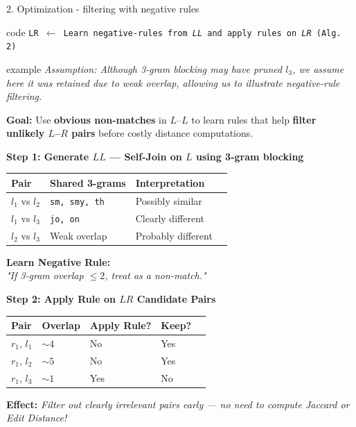 \documentclass[8pt]{beamer} %
\begin{document}
\begin{frame}{2. Optimization - filtering with negative rules}
	

	\begin{beamercolorbox}[rounded=true, shadow=true, leftskip=1em, rightskip=1em]{code}
		\texttt{LR $\leftarrow$ Learn negative-rules from \textit{LL} and apply rules on \textit{LR} (Alg. 2)}
	\end{beamercolorbox}


	

	\begin{beamercolorbox}[rounded=true, shadow=true, leftskip=1em, rightskip=1em]{example}
		\textit{\small Assumption: Although 3-gram blocking may have pruned $l_3$, we assume here it was retained due to weak overlap, allowing us to illustrate negative-rule filtering.}
		
		\vspace{1em}
		\textbf{Goal:} Use \textbf{obvious non-matches} in $L$–$L$ to learn rules that help \textbf{filter unlikely $L$–$R$ pairs} before costly distance computations.
		
		\vspace{0.5em}
		\textbf{Step 1: Generate $LL$ — Self-Join on $L$ using 3-gram blocking}
		
		\begin{tabular}{llll}
			\textbf{Pair} & \textbf{Shared 3-grams} & \textbf{Interpretation} \\
			\hline
			$l_1$ vs $l_2$ & \texttt{sm, smy, th}  & Possibly similar \\
			$l_1$ vs $l_3$ & \texttt{jo, on}       & Clearly different \\
			$l_2$ vs $l_3$ & Weak overlap          & Probably different \\
		\end{tabular}
		
		\vspace{0.5em}
		\textbf{Learn Negative Rule:} \\
		\textit{"If 3-gram overlap $\leq 2$, treat as a non-match."}
		
		\vspace{0.5em}
		\textbf{Step 2: Apply Rule on $LR$ Candidate Pairs}
		\begin{tabular}{lllll}
			\textbf{Pair} & \textbf{Overlap} & \textbf{Apply Rule?} & \textbf{Keep?} \\
			\hline
			$r_1$, $l_1$  & $\sim 4$  & No  & Yes \\
			$r_1$, $l_2$  & $\sim 5$  & No  & Yes \\
			$r_1$, $l_3$  & $\sim 1$  & Yes & No  \\
		\end{tabular}
		
		\vspace{0.5em}
		\textbf{Effect:} \textit{Filter out clearly irrelevant pairs early — no need to compute Jaccard or Edit Distance!}
	\end{beamercolorbox}
\end{frame}
\end{document}

